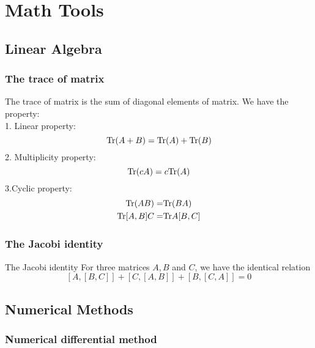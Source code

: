 \chapter{Math Tools}

\section{Linear Algebra}

\subsection{The trace of matrix}
The trace of matrix is the sum of diagonal elements of matrix. We have the property:\\
1. Linear property:
\begin{equation}
    {\rm Tr}(A+B) = {\rm Tr}(A) +{\rm Tr}(B)  \label{tracelinear}
\end{equation}
2. Multiplicity property:
\begin{equation}
    {\rm Tr}(cA) = c{\rm Tr}(A)  \label{tracemulti}
\end{equation}
3.Cyclic property:
\begin{equation}
  \begin{aligned}
    {\rm Tr}(AB) =& {\rm Tr}(BA)\\  \label{tracecyclic}
    {\rm Tr}[A,B]C =& {\rm Tr}A[B,C]
  \end{aligned}
\end{equation}


\subsection{The Jacobi identity}
\begin{theorem}{The Jacobi identity}{}
  For three matrices $A, B$ and $C$, we have the identical relation
  \begin{equation}
    \left[A, [B,C]\right] + \left[C, [A,B]\right] + \left[B, [C,A]\right] = 0 \label{Jacobidentity}
  \end{equation}
\end{theorem}

\section{Numerical Methods}
\subsection{Numerical differential method}
